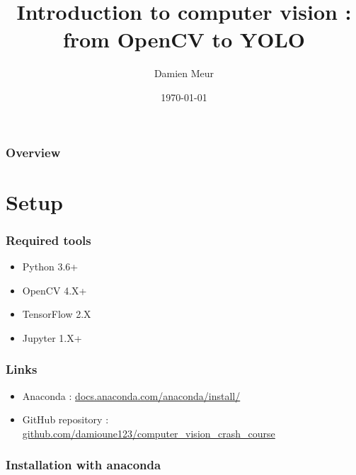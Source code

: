 \documentclass[tikz,table,border=2mm]{beamer}
\title[Computer vision crash course]{Introduction to computer vision : from OpenCV to YOLO} %
\author{Damien Meur} %
\institute[PXC] %
{
Proxyclick \\ %
\medskip
\textit{dmeur@proxyclick.com} %
}
\date{\today} %
\begin{document}
\begin{frame}
\titlepage %
\end{frame}

\begin{frame}
\frametitle{Overview} %
\tableofcontents %
\end{frame}


\section{Setup}

\begin{frame}
\frametitle{Required tools}
\begin{itemize}
\item Python 3.6+
\item OpenCV 4.X+
\item TensorFlow 2.X
\item Jupyter 1.X+
\end{itemize}
\end{frame}

\begin{frame}
\frametitle{Links}
\begin{itemize}
\item Anaconda : \url{docs.anaconda.com/anaconda/install/}
\item GitHub repository : \url{github.com/damioune123/computer_vision_crash_course}
\end{itemize}
\end{frame}

\begin{frame}
\frametitle{Installation with anaconda}

\end{frame}
\end{document}

